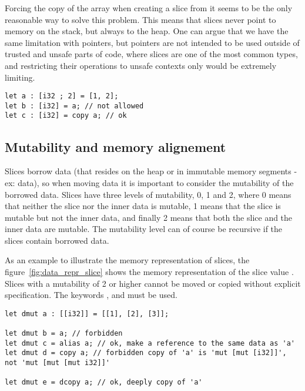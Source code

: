 Forcing the copy of the array when creating a slice from it seems to be the only
reasonable way to solve this problem. This means that slices never point to
memory on the stack, but always to the heap. One can argue that we have the same
limitation with pointers, but pointers are not intended to be used outside of
trusted and unsafe parts of code, where slices are one of the most common types,
and restricting their operations to unsafe contexts only would be extremely
limiting.

\begin{lstlisting}[style=coloredverbatim]
let a : [i32 ; 2] = [1, 2];
let b : [i32] = a; // not allowed
let c : [i32] = copy a; // ok
\end{lstlisting}



\subsection{Mutability and memory alignement}

Slices borrow data (that resides on the heap or in immutable memory segments -
ex: data), so when moving data it is important to consider the mutability of the
borrowed data. Slices have three levels of mutability, 0, 1 and 2, where 0 means
that neither the slice nor the inner data is mutable, 1 means that the slice is
mutable but not the inner data, and finally 2 means that both the slice and the
inner data are mutable. The mutability level can of course be recursive if the
slices contain borrowed data.


As an example to illustrate the memory representation of slices, the
figure~\ref{fig:data_repr_slice} shows the memory representation of the slice
value . Slices with a mutability of 2 or higher
cannot be moved or copied without explicit specification. The keywords
,  and  must be used.

\begin{lstlisting}[style=coloredverbatim]
let dmut a : [[i32]] = [[1], [2], [3]];

let dmut b = a; // forbidden
let dmut c = alias a; // ok, make a reference to the same data as 'a'
let dmut d = copy a; // forbidden copy of 'a' is 'mut [mut [i32]]', not 'mut [mut [mut i32]]'

let dmut e = dcopy a; // ok, deeply copy of 'a'
\end{lstlisting}




